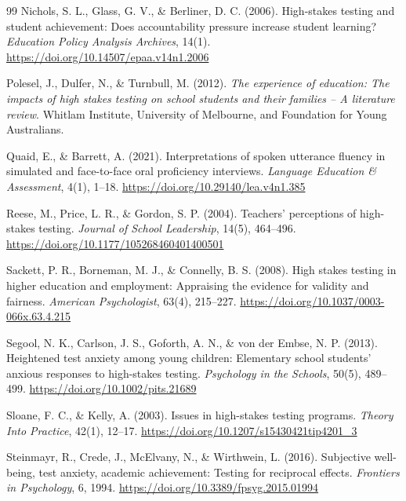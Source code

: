 \documentclass[11pt]{article}
\begin{document}
\begin{thebibliography}{99}
Nichols, S. L., Glass, G. V., \& Berliner, D. C. (2006). High-stakes testing and student achievement: Does accountability pressure increase student learning? \textit{Education Policy Analysis Archives}, 14(1). \url{https://doi.org/10.14507/epaa.v14n1.2006}

Polesel, J., Dulfer, N., \& Turnbull, M. (2012). \textit{The experience of education: The impacts of high stakes testing on school students and their families -- A literature review}. Whitlam Institute, University of Melbourne, and Foundation for Young Australians.

Quaid, E., \& Barrett, A. (2021). Interpretations of spoken utterance fluency in simulated and face-to-face oral proficiency interviews. \textit{Language Education \& Assessment}, 4(1), 1--18. \url{https://doi.org/10.29140/lea.v4n1.385}

Reese, M., Price, L. R., \& Gordon, S. P. (2004). Teachers' perceptions of high-stakes testing. \textit{Journal of School Leadership}, 14(5), 464--496. \url{https://doi.org/10.1177/105268460401400501}

Sackett, P. R., Borneman, M. J., \& Connelly, B. S. (2008). High stakes testing in higher education and employment: Appraising the evidence for validity and fairness. \textit{American Psychologist}, 63(4), 215--227. \url{https://doi.org/10.1037/0003-066x.63.4.215}

Segool, N. K., Carlson, J. S., Goforth, A. N., \& von der Embse, N. P. (2013). Heightened test anxiety among young children: Elementary school students' anxious responses to high-stakes testing. \textit{Psychology in the Schools}, 50(5), 489--499. \url{https://doi.org/10.1002/pits.21689}

Sloane, F. C., \& Kelly, A. (2003). Issues in high-stakes testing programs. \textit{Theory Into Practice}, 42(1), 12--17. \url{https://doi.org/10.1207/s15430421tip4201_3}

Steinmayr, R., Crede, J., McElvany, N., \& Wirthwein, L. (2016). Subjective well-being, test anxiety, academic achievement: Testing for reciprocal effects. \textit{Frontiers in Psychology}, 6, 1994. \url{https://doi.org/10.3389/fpsyg.2015.01994}


\end{thebibliography}
\end{document}
